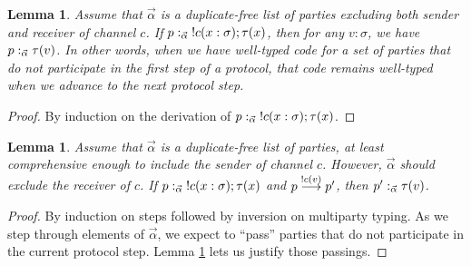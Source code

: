 \documentclass{amsbook}
\newtheorem{lemma}[theorem]{Lemma}
\theoremstyle{definition}
\theoremstyle{remark}
\numberwithin{section}{chapter}
\numberwithin{equation}{chapter}
\begin{document}
\begin{lemma}\label{preserve_unused}
  Assume that $\vec{\alpha}$ is a duplicate-free list of parties excluding both sender and receiver of channel $c$.
  If $p :_{\vec{\alpha}} \; !c(x : \sigma); \tau(x)$, then for any $v : \sigma$, we have $p :_{\vec{\alpha}} \tau(v)$.
  In other words, when we have well-typed code for a set of parties that do not participate in the first step of a protocol, that code remains well-typed when we advance to the next protocol step.
\end{lemma}
\begin{proof}
  By induction on the derivation of $p :_{\vec{\alpha}} \; !c(x : \sigma); \tau(x)$.
\end{proof}

\begin{lemma}\label{find_sender}
  Assume that $\vec{\alpha}$ is a duplicate-free list of parties, at least comprehensive enough to include the sender of channel $c$.
  However, $\vec{\alpha}$ should \emph{exclude} the receiver of $c$.
  If $p :_{\vec{\alpha}} \; !c(x : \sigma); \tau(x)$ and $p \stackrel{!c(v)}{\longrightarrow} p'$, then $p' :_{\vec{\alpha}} \tau(v)$.
\end{lemma}
\begin{proof}
  By induction on steps followed by inversion on multiparty typing.
  As we step through elements of $\vec{\alpha}$, we expect to ``pass'' parties that do not participate in the current protocol step.
  Lemma \ref{preserve_unused} lets us justify those passings.
\end{proof}
\end{document}
